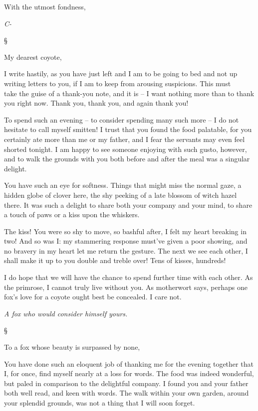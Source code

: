 \documentclass[12pt,letterpaper,oneside]{memoir}
\newcommand\secdiv{
  \begin{center}
    \S
  \end{center}
}
\begin{document}
  With the utmost fondness,

  \emph{C-}

  \secdiv

  My dearest coyote,

  I write hastily, as you have just left and I am to be going to bed and
  not up writing letters to you, if I am to keep from arousing suspicions.
  This must\\
  take the guise of a thank-you note, and it is -- I want nothing more
  than to thank you right now. Thank you, thank you, and again thank you!

  To spend such an evening -- to consider spending many such more -- I do
  not hesitate to call myself smitten! I trust that you found the food
  palatable, for you certainly ate more than me or my father, and I fear
  the servants may even feel shorted tonight. I am happy to see someone
  enjoying with such gusto, however, and to walk the grounds with you both
  before and after the meal was a singular delight.

  You have such an eye for softness. Things that might miss the normal
  gaze, a hidden globe of clover here, the shy peeking of a late blossom
  of witch hazel there. It was such a delight to share both your company
  and your mind, to share a touch of paws or a kiss upon the whiskers.

  The kiss! You were so shy to move, so bashful after, I felt my heart
  breaking in two! And so was I: my stammering response must've given a
  poor showing, and no bravery in my heart let me return the gesture. The
  next we see each other, I shall make it up to you double and treble
  over! Tens of kisses, hundreds!

  I do hope that we will have the chance to spend further time with each
  other. As the primrose, I cannot truly live without you. As motherwort
  says, perhaps one fox's love for a coyote ought best be concealed. I
  care not.

  \emph{A fox who would consider himself yours.}

  \secdiv

  To a fox whose beauty is surpassed by none,

  You have done such an eloquent job of thanking me for the evening
  together that I, for once, find myself nearly at a loss for words. The
  food was indeed wonderful, but paled in comparison to the delightful
  company. I found you and your father both well read, and keen with
  words. The walk within your own garden, around your splendid grounds,
  was not a thing that I will soon forget.
\end{document}

